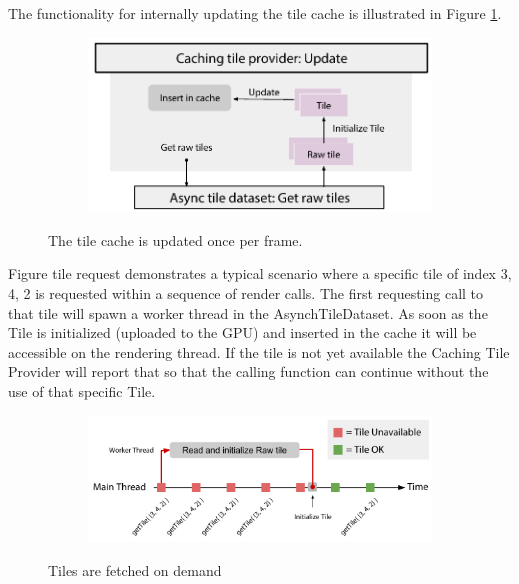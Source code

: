 The functionality for internally updating the tile cache is illustrated in Figure \ref{fig:cachingtileprovider_update}.

\begin{figure}[htbp]
    \centering
    \begin{subfigure}[bt]{0.8\textwidth}
        \includegraphics[width=\textwidth]{figures/implementation/tileprovider/cachingtileprovider_update.pdf}
    \end{subfigure}
    \caption{The tile cache is updated once per frame.}
    \label{fig:cachingtileprovider_update}
\end{figure}

Figure tile request demonstrates a typical scenario where a specific tile of index {3, 4, 2} is requested within a sequence of render calls. The first requesting call to that tile will spawn a worker thread in the AsynchTileDataset. As soon as the Tile is initialized (uploaded to the GPU) and inserted in the cache it will be accessible on the rendering thread. If the tile is not yet available the Caching Tile Provider will report that so that the calling function can continue without the use of that specific Tile.

\begin{figure}[htbp]
    \centering
    \begin{subfigure}[bt]{0.8\textwidth}
        \includegraphics[width=\textwidth]{figures/implementation/tileprovider/cachingtileprovider_tilerequest.pdf}
    \end{subfigure}
    \caption{Tiles are fetched on demand}
    \label{fig:cachingtileprovider_tilerequest}
\end{figure}

